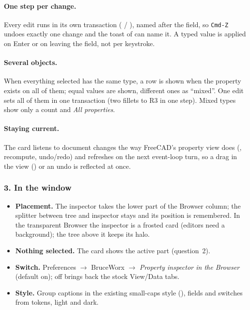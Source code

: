 \paragraph{One step per change.} Every edit runs in its own transaction ( /
), named after the field, so \texttt{Cmd-Z} undoes exactly one change and the toast of
 can name it. A typed value is applied on Enter or on leaving the field, not per keystroke.

\paragraph{Several objects.} When everything selected has the same type, a row is shown when the property exists on
all of them; equal values are shown, different ones as ``mixed''. One edit sets all of them in one transaction (two
fillets to R3 in one step). Mixed types show only a count and \emph{All properties}.

\paragraph{Staying current.} The card listens to document changes the way FreeCAD's property view does
(, recompute, undo/redo) and refreshes on the next event-loop turn, so a drag in the view
() or an undo is reflected at once.

\subsubsection*{3. In the window}

\begin{itemize}[nosep]
  \item \textbf{Placement.} The inspector takes the lower part of the Browser column; the splitter between tree and
        inspector stays and its position is remembered. In the transparent Browser the inspector is a frosted card
        (editors need a background); the tree above it keeps its halo.
  \item \textbf{Nothing selected.} The card shows the active part (question~2).
  \item \textbf{Switch.} Preferences $\rightarrow$ BruceWorx $\rightarrow$ \emph{Property inspector in the Browser}
        (default on); off brings back the stock View/Data tabs.
  \item \textbf{Style.} Group captions in the existing small-caps style (), fields and
        switches from  tokens, light and dark.
\end{itemize}

